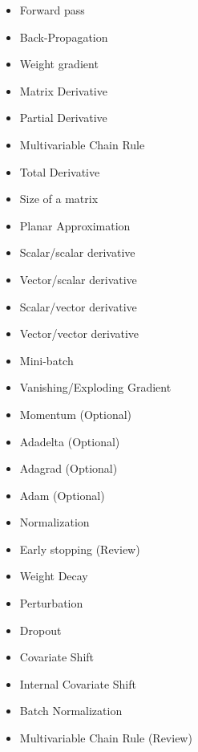     
    \begin{itemize}
        \item Forward pass
        \item Back-Propagation
        \item Weight gradient
        \item Matrix Derivative
        \item Partial Derivative
        \item Multivariable Chain Rule
        \item Total Derivative
        \item Size of a matrix
        \item Planar Approximation
        \item Scalar/scalar derivative
        \item Vector/scalar derivative
        \item Scalar/vector derivative
        \item Vector/vector derivative
        \item Mini-batch
        \item Vanishing/Exploding Gradient
        \item Momentum (Optional)
        \item Adadelta (Optional)
        \item Adagrad (Optional)
        \item Adam (Optional)
        \item Normalization
        \item Early stopping (Review)
        \item Weight Decay
        \item Perturbation
        \item Dropout
        \item Covariate Shift
        \item Internal Covariate Shift
        \item Batch Normalization
        \item Multivariable Chain Rule (Review)
    \end{itemize}

